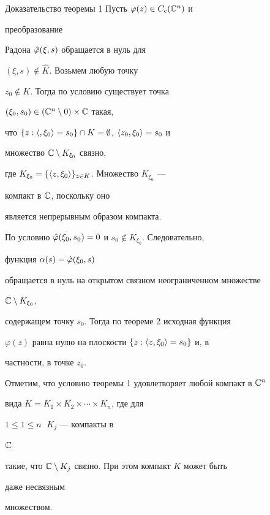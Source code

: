  


\begin{pf*}{Доказательство теоремы 1} Пусть $\varphi(z)\in C_c(\Bbb C^n)$ и 


преобразование 


Радона $\Hat\varphi(\xi,s)$ обращается в нуль для 


$(\xi,s)\notin\widehat K$. Возьмем любую точку 


$z_0\notin K$. Тогда по условию существует точка 


$(\xi_0,s_0)\in(\Bbb C^n\setminus 0)\times\Bbb C$ такая, 


что $\{z:\langle,\xi_0\rangle=s_0\}\cap K=\emptyset$, $\langle z_0,\xi_0\rangle=s_0$ и 


множество $\Bbb C\setminus K_{\xi_0}$ связно, 


где $K_{\xi_0}=\{\langle z,\xi_0\rangle\}_{z\in K}$. Множество $K_{\xi_0}$ --- 


компакт в $\Bbb C$, поскольку оно 


является непрерывным образом компакта. 


 


По условию $\Hat\varphi(\xi_0,s_0)=0$ и $s_0\notin K_{\xi_0}$. Следовательно,


функция $\alpha(s)=\Hat\varphi(\xi_0,s)$ 


обращается в нуль на открытом связном неограниченном множестве 


$\Bbb C\setminus K_{\xi_0}$, 


содержащем точку $s_0$. Тогда по теореме 2 исходная функция 


$\varphi(z)$ равна нулю на плоскости $\{z:\langle z,\xi_0\rangle=s_0\}$ и, в


частности, в точке $z_0$.


\end{pf*} 


 


Отметим, что условию теоремы 1 удовлетворяет любой компакт в $\Bbb C^n$ 


вида $K=K_1\times K_2\times\dotsm\times K_n$, где для 


$1\le 1\le n\;$ $K_j$ --- компакты в 


$\Bbb C$


такие, что $\Bbb C\setminus K_j$ связно. При этом компакт $K$ может быть 


даже несвязным 


множеством. 


